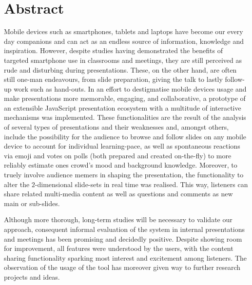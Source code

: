 \chapter{Abstract}
Mobile devices such as smartphones, tablets and laptops have become our every day companions and can act as an endless source of information, knowledge and inspiration. However, despite studies having demonstrated the benefits of targeted smartphone use in classrooms and meetings, they are still perceived as rude and disturbing during presentations. These, on the other hand, are often still one-man endeavours, from slide preparation, giving the talk to lastly follow-up work such as hand-outs. In an effort to destigmatise mobile devices usage and make presentations more memorable, engaging, and collaborative, a prototype of an extensible JavaScript presentation eco\-system with a multitude of interactive mechanisms was implemented. These functionalities are the result of the analysis of several types of presentations and their weaknesses and, amongst others, include the possibility for the audience to browse and follow slides on any mobile device to account for individual learning-pace, as well as spontaneous reactions via emoji and votes on polls (both prepared and created on-the-fly) to more reliably estimate ones crowd's mood and background knowledge. Moreover, to truely involve audience memers in shaping the presentation, the functionality to alter the $2$-dimensional slide-sets in real time was realised. This way, listeners can share related multi-media content as well as questions and comments as new main or sub-slides.

Although more thorough, long-term studies will be necessary to validate our approach, consequent informal evaluation of the system in internal presentations and meetings has been promising and decidedly positive. Despite showing room for improvement, all features were understood by the users, with the content sharing functionality sparking most interest and excitement among listeners. The observation of the usage of the tool has moreover given way to further research projects and ideas. 